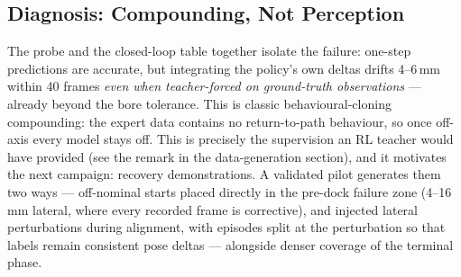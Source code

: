 \subsection{Diagnosis: Compounding, Not Perception}

The probe and the closed-loop table together isolate the failure:
one-step predictions are accurate, but integrating the policy's own
deltas drifts 4--6\,mm within 40 frames \emph{even when
teacher-forced on ground-truth observations} --- already beyond the
bore tolerance. This is classic behavioural-cloning compounding: the
expert data contains no return-to-path behaviour, so once off-axis
every model stays off. This is precisely the supervision an RL
teacher would have provided (see the remark in the data-generation
section), and it motivates the next campaign: recovery
demonstrations. A validated pilot generates them two ways ---
off-nominal starts placed directly in the pre-dock failure zone
(4--16\,mm lateral, where every recorded frame is corrective), and
injected lateral perturbations during alignment, with episodes split
at the perturbation so that labels remain consistent pose deltas ---
alongside denser coverage of the terminal phase.
